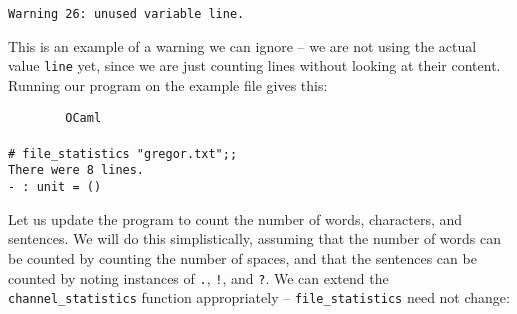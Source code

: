 \documentclass[]{book}
\newcommand\upquote[1]{\textquotesingle#1\textquotesingle}
\newcommand{\smspace}{\vspace{4mm}}
\begin{document}
\smspace
\texttt{Warning 26:\ unused variable line.}
\smspace

\noindent This is an example of a warning we can ignore -- we are not using the actual value \texttt{line} yet, since we are just counting lines without looking at their content. Running our program on the example file gives this:

\smspace
\noindent\verb!        OCaml!\\
\noindent\\
\noindent\verb!# file_statistics "gregor.txt";;!\\
\noindent\verb!There were 8 lines.!\\
\noindent\verb!- : unit = ()!
\smspace

\noindent Let us update the program to count the number of words, characters, and sentences. We will do this simplistically, assuming that the number of words can be counted by counting the number of spaces, and that the sentences can be counted by noting instances of \texttt{\upquote{.}}, \texttt{\upquote{!}}, and \texttt{\upquote{?}}. We can extend the \texttt{channel\_statistics} function appropriately -- \texttt{file\_statistics} need not change:
\end{document}
